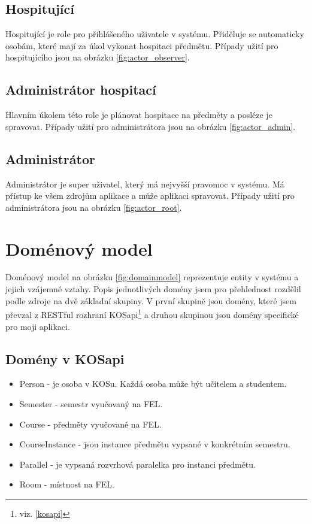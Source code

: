 \subsection{Hospitující}
Hospitující je role pro přihlášeného uživatele v systému. Přiděluje se automaticky osobám, které mají za úkol vykonat hospitaci předmětu. Případy užití pro hospitujícího jsou na obrázku \ref{fig:actor_observer}.

\subsection{Administrátor hospitací}
Hlavním úkolem této role je plánovat hospitace na předměty a posléze je spravovat. Případy užití pro administrátora jsou na obrázku \ref{fig:actor_admin}.

\subsection{Administrátor}
Administrátor je super uživatel, který má nejvyšší pravomoc v systému. Má přístup ke všem zdrojům aplikace a může aplikaci spravovat. Případy užití pro administrátora jsou na obrázku \ref{fig:actor_root}.

\newpage 
\section{Doménový model}
Doménový model na obrázku \ref{fig:domainmodel} reprezentuje entity v systému a jejich vzájemné vztahy. Popis jednotlivých domény jsem pro přehlednost rozdělil podle zdroje na dvě základní skupiny. V první skupině jsou domény, které jsem převzal z RESTful rozhraní KOSapi\footnote{viz. \ref{kosapi}} a druhou skupinou jsou domény specifické pro moji aplikaci. 

\label{sec:domeny_kosapi} 
\subsection{Domény v KOSapi}
\begin{itemize}
\item Person - je osoba v KOSu. Každá osoba může být učitelem a studentem.
\item Semester - semestr vyučovaný na FEL. 
\item Course - předměty vyučované na FEL.
\item CourseInstance - jsou instance předmětu vypsané v konkrétním semestru.
\item Parallel - je vypsaná rozvrhová paralelka pro instanci předmětu.
\item Room - místnost na FEL.
\end{itemize}

